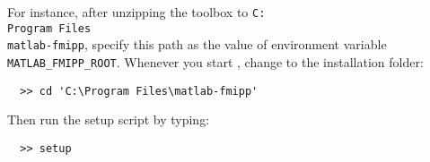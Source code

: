 For instance, after unzipping the toolbox to \texttt{C:\\Program~Files\\matlab-fmipp}, specify this path as the value of environment variable \texttt{MATLAB\_FMIPP\_ROOT}.
Whenever you start \matlab, change to the installation folder:
\begin{verbatim}
  >> cd 'C:\Program Files\matlab-fmipp'
\end{verbatim}
Then run the setup script by typing:
\begin{verbatim}
  >> setup
\end{verbatim}
